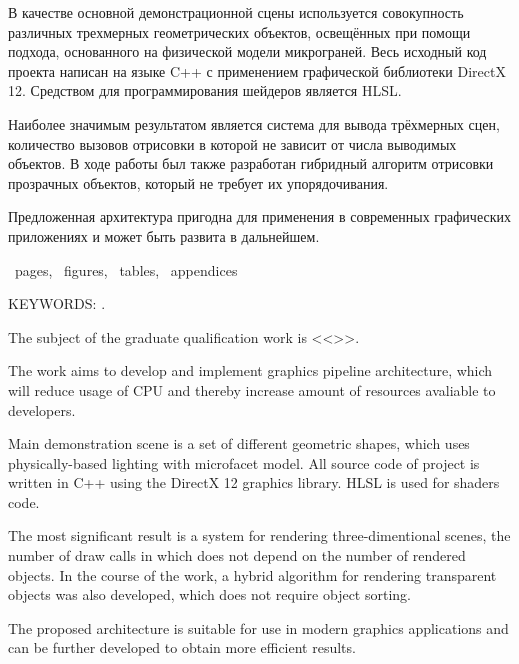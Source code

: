 В качестве основной демонстрационной сцены используется совокупность различных трехмерных геометрических объектов, освещённых при помощи подхода, основанного на физической модели микрограней. Весь исходный код проекта написан на языке C++ с применением графической библиотеки DirectX 12. Средством для программирования шейдеров является HLSL.

Наиболее значимым результатом является система для вывода трёхмерных сцен, количество вызовов отрисовки в которой не зависит от числа выводимых объектов. В ходе работы был также разработан гибридный алгоритм отрисовки прозрачных объектов, который не требует их упорядочивания.

Предложенная архитектура пригодна для применения в современных графических приложениях и может быть развита в дальнейшем.


\newpage

\printTheAbstract %


~pages, 
~figures, 
~tables,
~appendices%

{\MakeUppercase{Keywords: \keywordsEn}.} %
	
The subject of the graduate qualification work is <<\thesisTitleEn>>.

The work aims to develop and implement graphics pipeline architecture, which will reduce usage of CPU and thereby increase amount of resources avaliable to developers.

Main demonstration scene is a set of different geometric shapes, which uses physically-based lighting with microfacet model. All source code of project is written in C++ using the DirectX 12 graphics library. HLSL is used for shaders code.

The most significant result is a system for rendering three-dimentional scenes, the number of draw calls in which does not depend on the number of rendered objects. In the course of the work, a hybrid algorithm for rendering transparent objects was also developed, which does not require object sorting.

The proposed architecture is suitable for use in modern graphics applications and can be further developed to obtain more efficient results.
	
	

\newpage
\thispagestyle{empty}
%
